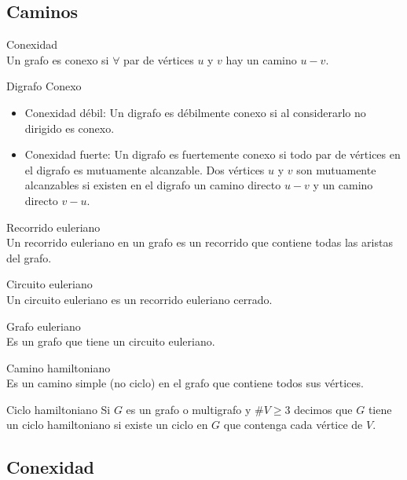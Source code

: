 \documentclass{article}
\begin{document}
\subsection{Caminos}
\begin{defn}
Conexidad \\ Un grafo es conexo si $\forall$ par de vértices $u$ y $v$ hay un camino $u-v$.
\end{defn}

\begin{defn}
Digrafo Conexo
\begin{itemize}
    \item Conexidad débil: Un digrafo es débilmente conexo si al considerarlo no dirigido es conexo.
    \item Conexidad fuerte: Un digrafo es fuertemente conexo si todo par de vértices en el digrafo es mutuamente alcanzable. Dos vértices $u$ y $v$ son mutuamente alcanzables si existen en el digrafo un camino directo $u-v$ y un camino directo $v-u$.
\end{itemize} 
\end{defn}
\begin{defn}
Recorrido euleriano \\ Un recorrido euleriano en un grafo es un recorrido que contiene todas las aristas del grafo.
\end{defn}

\begin{defn}
Circuito euleriano \\ Un circuito euleriano es un recorrido euleriano cerrado.
\end{defn}

\begin{defn}
Grafo euleriano \\ Es un grafo que tiene un circuito euleriano.
\end{defn}

\begin{defn}
Camino hamiltoniano \\ Es un camino simple (no ciclo) en el grafo que contiene todos sus vértices.
\end{defn}

\begin{defn}
Ciclo hamiltoniano Si $G$ es un grafo o multigrafo y $\# V \geq 3$ decimos que $G$ tiene un ciclo hamiltoniano si existe un ciclo en $G$ que contenga cada vértice de $V$.
\end{defn}

\subsection{Conexidad}
\end{document}
